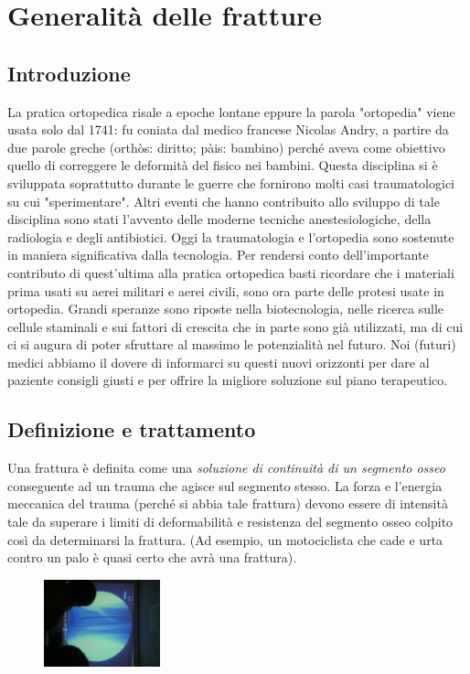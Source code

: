 \section{Generalità delle fratture}

\subsection{Introduzione}
La pratica ortopedica risale a epoche lontane eppure la parola "ortopedia" viene usata solo dal 1741: fu coniata dal medico francese Nicolas Andry, a partire da due parole greche (orthòs: diritto; pàis: bambino) perché aveva come obiettivo quello di correggere le deformità del fisico nei bambini.
Questa disciplina si è sviluppata soprattutto durante le guerre che fornirono molti casi traumatologici su cui "sperimentare".
Altri eventi che hanno contribuito allo sviluppo di tale disciplina sono stati l'avvento delle moderne tecniche anestesiologiche, della radiologia e degli antibiotici.
Oggi la traumatologia e l'ortopedia sono sostenute in maniera significativa dalla tecnologia. Per rendersi conto dell'importante contributo di quest'ultima alla pratica ortopedica basti ricordare che i materiali prima usati su aerei militari e aerei civili, sono ora parte delle protesi usate in ortopedia.
Grandi speranze sono riposte nella biotecnologia, nelle ricerca sulle cellule staminali e sui fattori di crescita che in parte sono già utilizzati, ma di cui ci si augura di poter sfruttare al massimo le potenzialità nel futuro. Noi (futuri) medici abbiamo il dovere di
informarci su questi nuovi orizzonti per dare al paziente consigli giusti e per offrire la migliore soluzione sul piano terapeutico.

\subsection{Definizione e trattamento}
Una frattura è definita come una \emph{soluzione di continuità di un segmento osseo} conseguente ad un trauma che agisce sul segmento stesso.
La forza e l'energia meccanica del trauma (perché si abbia tale frattura) devono essere di intensità tale da superare i limiti di deformabilità e resistenza del segmento osseo colpito così da determinarsi la frattura. (Ad esempio, un motociclista che cade e urta
contro un palo è quasi certo che avrà una frattura).

\begin{figure}[!ht]
\centering
\includegraphics[width=0.3\textwidth]{001/image1.jpeg}
\end{figure}


